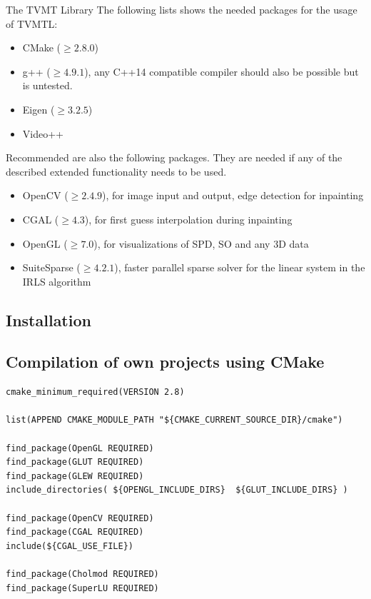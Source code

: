 \begin{chapter}{The TVMT Library}
The following lists shows the needed packages for the usage of TVMTL:
\begin{itemize}
    \item CMake ($\geq 2.8.0$)
    \item g++ ($\geq 4.9.1$), any C++14 compatible compiler should also be possible but is untested.
    \item Eigen ($\geq 3.2.5$)
    \item Video++
\end{itemize}

Recommended are also the following packages. They are needed if any of the described extended functionality needs to be used.
\begin{itemize}
    \item OpenCV ($\geq 2.4.9$), for image input and output, edge detection for inpainting
    \item CGAL ($\geq 4.3$), for first guess interpolation during inpainting
    \item OpenGL ($\geq 7.0$), for visualizations of SPD, SO and any 3D data
    \item SuiteSparse ($\geq 4.2.1$), faster parallel sparse solver for the linear system in the IRLS algorithm
\end{itemize}

\subsection{Installation} %
\label{sub:Installation}


\subsection{Compilation of own projects using CMake} %
\label{sub:CMakeCompilation}
\begin{lstlisting}
cmake_minimum_required(VERSION 2.8)

list(APPEND CMAKE_MODULE_PATH "${CMAKE_CURRENT_SOURCE_DIR}/cmake")

find_package(OpenGL REQUIRED)
find_package(GLUT REQUIRED)
find_package(GLEW REQUIRED)
include_directories( ${OPENGL_INCLUDE_DIRS}  ${GLUT_INCLUDE_DIRS} )

find_package(OpenCV REQUIRED)
find_package(CGAL REQUIRED)
include(${CGAL_USE_FILE})

find_package(Cholmod REQUIRED)
find_package(SuperLU REQUIRED)


\end{lstlisting}
\end{chapter}
